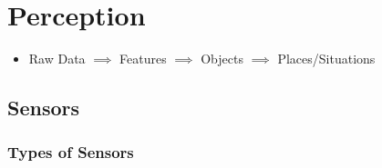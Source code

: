 \documentclass[a4paper]{article}
\begin{document}

\section{Perception}
\begin{itemize}
    \item Raw Data $\implies$ Features $\implies$ Objects $\implies$ Places/Situations
\end{itemize}

\subsection{Sensors}
\subsubsection{Types of Sensors}
\end{document}
